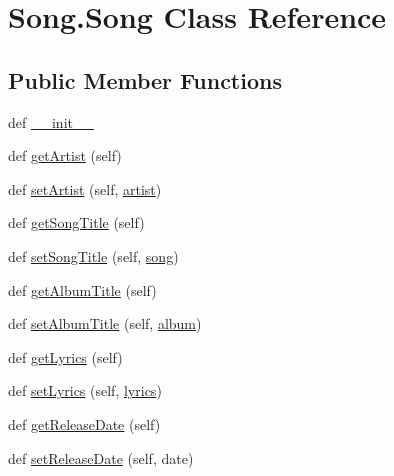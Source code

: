 \hypertarget{class_song_1_1_song}{}\section{Song.\+Song Class Reference}
\label{class_song_1_1_song}
\subsection*{Public Member Functions}
\begin{DoxyCompactItemize}
\item 
def \hyperlink{class_song_1_1_song_a7c712398cc9d5baf8e6f09f4c3918908}{\+\_\+\+\_\+init\+\_\+\+\_\+}
\item 
def \hyperlink{class_song_1_1_song_a62e7e0e4572b387a0c2af78e77dbe728}{get\+Artist} (self)
\item 
def \hyperlink{class_song_1_1_song_a05f3a6402149c46f1443e2fa0b6522b4}{set\+Artist} (self, \hyperlink{class_song_1_1_song_a43f00a67117668a929591164817c0183}{artist})
\item 
def \hyperlink{class_song_1_1_song_ab0f1fd5bf24722e8bed3a76cf63fa5a0}{get\+Song\+Title} (self)
\item 
def \hyperlink{class_song_1_1_song_ab3915e63c2a624e69cf7d3d0e771b960}{set\+Song\+Title} (self, \hyperlink{class_song_1_1_song_ace7c0f2f4985b73383d754c73caef745}{song})
\item 
def \hyperlink{class_song_1_1_song_a8f49c51da7549925fbe53332c9e7c150}{get\+Album\+Title} (self)
\item 
def \hyperlink{class_song_1_1_song_ad60c9bb355ef99775c11f98e99d09d97}{set\+Album\+Title} (self, \hyperlink{class_song_1_1_song_ad0d1e6cf79e3730a30231e799b880444}{album})
\item 
def \hyperlink{class_song_1_1_song_a06ba442bbf891e9d0e6955231327e46c}{get\+Lyrics} (self)
\item 
def \hyperlink{class_song_1_1_song_a21be1669f271664cc45f5f3695ea6efa}{set\+Lyrics} (self, \hyperlink{class_song_1_1_song_a615d9c5a45416c8bc394f0f8933ea01b}{lyrics})
\item 
def \hyperlink{class_song_1_1_song_a7f932d10de6f5873a9b257c1de00f0b7}{get\+Release\+Date} (self)
\item 
def \hyperlink{class_song_1_1_song_abc2cbaf2d3b19a7e58d3a11a5c5f494d}{set\+Release\+Date} (self, date)
\end{DoxyCompactItemize}
